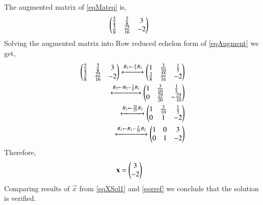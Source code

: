\documentclass[journal,12pt,twocolumn]{IEEEtran}
\begin{document}
The augmented matrix of \eqref{eqMateq} is,
\begin{align}
\begin{pmatrix}\frac{5}{4}&\frac{3}{8} &3\\\frac{3}{8}&\frac{25}{16}&-2\end{pmatrix} & \label{eqAugment}
\end{align}
Solving the augmented matrix into Row reduced echelon form of \eqref{eqAugment} we get,
\begin{align}
\begin{pmatrix}\frac{5}{4}&\frac{3}{8} &3\\\frac{3}{8}&\frac{25}{16}&-2\end{pmatrix}\xleftrightarrow[]{R_1\leftarrow\frac{4}{5}R_1}\begin{pmatrix}1&\frac{3}{10}&\frac{1}{5}\\\frac{3}{8}&\frac{25}{16}&-2\end{pmatrix}\\
\xleftrightarrow[]{R_2\leftarrow R_2-\frac{3}{8}R_1}\begin{pmatrix}1&\frac{3}{10}&\frac{1}{5}\\0&\frac{29}{20}&-\frac{29}{10}\end{pmatrix}\\
\xleftrightarrow[]{R_2\leftarrow \frac{20}{29}R_2}\begin{pmatrix}1&\frac{3}{10}&\frac{1}{5}\\0&1&-2\end{pmatrix}\\
\xleftrightarrow[]{R_1\leftarrow R_1-\frac{3}{10}R_2}\begin{pmatrix}1&0&3\\0&1&-2\end{pmatrix}
\end{align}
Therefore,
\begin{align}
   \mathbf{x}&=\begin{pmatrix}3\\-2\end{pmatrix}\label{eqrref}
\end{align}
Comparing results of $\vec{x}$ from \eqref{eqXSol1} and \eqref{eqrref} we conclude that the solution is verified.
\end{document}

